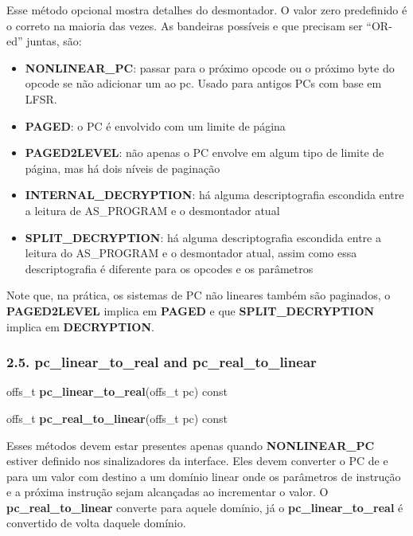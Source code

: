 \documentclass[letterpaper,10pt,brazil]{sphinxmanual}
\begin{document}
Esse método opcional mostra detalhes do desmontador. O valor zero
predefinido é o correto na maioria das vezes. As bandeiras possíveis e
que precisam ser ``OR-ed'' juntas, são:
\begin{itemize}
\item {} 
\textbf{NONLINEAR\_PC}: passar para o próximo opcode ou o próximo byte do opcode se não adicionar um ao pc. Usado para antigos PCs com base em LFSR.

\item {} 
\textbf{PAGED}: o PC é envolvido com um limite de página

\item {} 
\textbf{PAGED2LEVEL}: não apenas o PC envolve em algum tipo de limite de página, mas há dois níveis de paginação

\item {} 
\textbf{INTERNAL\_DECRYPTION}: há alguma descriptografia escondida entre a leitura de AS\_PROGRAM e o desmontador atual

\item {} 
\textbf{SPLIT\_DECRYPTION}: há alguma descriptografia escondida entre a leitura do AS\_PROGRAM e o desmontador atual, assim como essa descriptografia é diferente para os opcodes e os parâmetros

\end{itemize}

Note que, na prática, os sistemas de PC não lineares também são paginados,
o \textbf{PAGED2LEVEL} implica em \textbf{PAGED} e que \textbf{SPLIT\_DECRYPTION}
implica em \textbf{DECRYPTION}.


\subsubsection{2.5. pc\_linear\_to\_real and pc\_real\_to\_linear}
\label{techspecs/device_disasm_interface:pc-linear-to-real-and-pc-real-to-linear}
\begin{DUlineblock}{0em}
\item[] offs\_t \textbf{pc\_linear\_to\_real}(offs\_t pc) const
\item[] offs\_t \textbf{pc\_real\_to\_linear}(offs\_t pc) const
\end{DUlineblock}

Esses métodos devem estar presentes apenas quando \textbf{NONLINEAR\_PC}
estiver definido nos sinalizadores da interface. Eles devem converter o
PC de e para um valor com destino a um domínio linear onde os parâmetros
de instrução e a próxima instrução sejam alcançadas ao incrementar o
valor. O \textbf{pc\_real\_to\_linear} converte para aquele domínio, já o
\textbf{pc\_linear\_to\_real} é convertido de volta daquele domínio.
\end{document}
